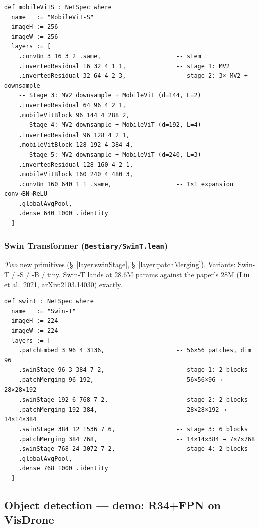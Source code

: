 \begin{verbatim}
def mobileViTS : NetSpec where
  name   := "MobileViT-S"
  imageH := 256
  imageW := 256
  layers := [
    .convBn 3 16 3 2 .same,                     -- stem
    .invertedResidual 16 32 4 1 1,              -- stage 1: MV2
    .invertedResidual 32 64 4 2 3,              -- stage 2: 3× MV2 + downsample
    -- Stage 3: MV2 downsample + MobileViT (d=144, L=2)
    .invertedResidual 64 96 4 2 1,
    .mobileVitBlock 96 144 4 288 2,
    -- Stage 4: MV2 downsample + MobileViT (d=192, L=4)
    .invertedResidual 96 128 4 2 1,
    .mobileVitBlock 128 192 4 384 4,
    -- Stage 5: MV2 downsample + MobileViT (d=240, L=3)
    .invertedResidual 128 160 4 2 1,
    .mobileVitBlock 160 240 4 480 3,
    .convBn 160 640 1 1 .same,                  -- 1×1 expansion conv→BN→ReLU
    .globalAvgPool,
    .dense 640 1000 .identity
  ]
\end{verbatim}

\subsubsection*{Swin Transformer (\texttt{Bestiary/SwinT.lean})}
\emph{Two} new primitives (\S~\ref{layer:swinStage},
\S~\ref{layer:patchMerging}). Variants: Swin-T / -S / -B / tiny.
Swin-T lands at 28.6M params against the paper's 28M (Liu et al.\ 2021,
\href{https://arxiv.org/abs/2103.14030}{arXiv:2103.14030}) exactly.

\begin{verbatim}
def swinT : NetSpec where
  name   := "Swin-T"
  imageH := 224
  imageW := 224
  layers := [
    .patchEmbed 3 96 4 3136,                    -- 56×56 patches, dim 96
    .swinStage 96 3 384 7 2,                    -- stage 1: 2 blocks
    .patchMerging 96 192,                       -- 56×56×96 → 28×28×192
    .swinStage 192 6 768 7 2,                   -- stage 2: 2 blocks
    .patchMerging 192 384,                      -- 28×28×192 → 14×14×384
    .swinStage 384 12 1536 7 6,                 -- stage 3: 6 blocks
    .patchMerging 384 768,                      -- 14×14×384 → 7×7×768
    .swinStage 768 24 3072 7 2,                 -- stage 4: 2 blocks
    .globalAvgPool,
    .dense 768 1000 .identity
  ]
\end{verbatim}

\subsection{Object detection --- demo: R34+FPN on VisDrone}
\label{sec:bestiary_detection}

